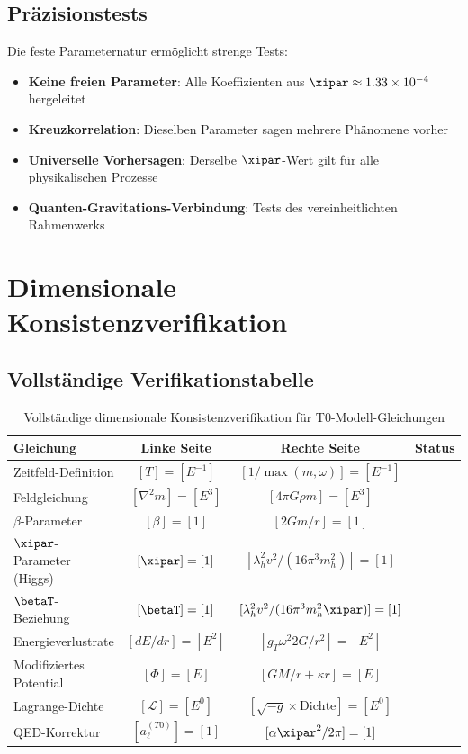 	\subsection{Präzisionstests}
	\label{subsec:praezisionstests}
	
	Die feste Parameternatur ermöglicht strenge Tests:
	\begin{itemize}
		\item \textbf{Keine freien Parameter}: Alle Koeffizienten aus $\xipar \approx 1.33 \times 10^{-4}$ hergeleitet
		\item \textbf{Kreuzkorrelation}: Dieselben Parameter sagen mehrere Phänomene vorher
		\item \textbf{Universelle Vorhersagen}: Derselbe $\xipar$-Wert gilt für alle physikalischen Prozesse
		\item \textbf{Quanten-Gravitations-Verbindung}: Tests des vereinheitlichten Rahmenwerks
	\end{itemize}
	
	\section{Dimensionale Konsistenzverifikation}
	\label{sec:dimensionale_verifikation}
	
	\subsection{Vollständige Verifikationstabelle}
	\label{subsec:verifikationstabelle}
	
	\begin{table}[htbp]
		\centering
		\begin{tabular}{lccl}
			\toprule
			\textbf{Gleichung} & \textbf{Linke Seite} & \textbf{Rechte Seite} & \textbf{Status} \\
			\midrule
			Zeitfeld-Definition & $[T] = [E^{-1}]$ & $[1/\max(m,\omega)] = [E^{-1}]$ & \checkmark \\
			Feldgleichung & $[\nabla^2 m] = [E^3]$ & $[4\pi G \rho m] = [E^3]$ & \checkmark \\
			$\beta$-Parameter & $[\beta] = [1]$ & $[2Gm/r] = [1]$ & \checkmark \\
			$\xipar$-Parameter (Higgs) & $[\xipar] = [1]$ & $[\lambda_h^2 v^2/(16\pi^3 m_h^2)] = [1]$ & \checkmark \\
			$\betaT$-Beziehung & $[\betaT] = [1]$ & $[\lambda_h^2 v^2/(16\pi^3 m_h^2 \xipar)] = [1]$ & \checkmark \\
			Energieverlustrate & $[dE/dr] = [E^2]$ & $[g_T \omega^2 2G/r^2] = [E^2]$ & \checkmark \\
			Modifiziertes Potential & $[\Phi] = [E]$ & $[GM/r + \kappa r] = [E]$ & \checkmark \\
			Lagrange-Dichte & $[\mathcal{L}] = [E^0]$ & $[\sqrt{-g} \times \text{Dichte}] = [E^0]$ & \checkmark \\
			QED-Korrektur & $[a_\ell^{(T0)}] = [1]$ & $[\alpha \xipar^2/2\pi] = [1]$ & \checkmark \\
			\bottomrule
		\end{tabular}
		\caption{Vollständige dimensionale Konsistenzverifikation für T0-Modell-Gleichungen}
	\end{table}
	
